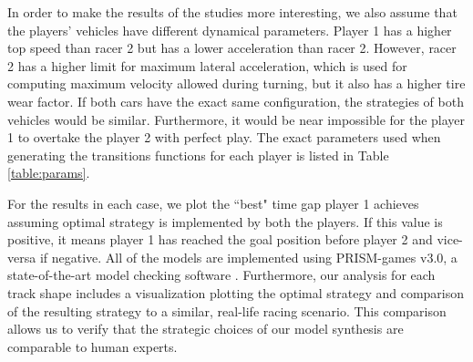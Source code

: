In order to make the results of the studies more interesting, we also assume that the players' vehicles have different dynamical parameters. Player 1 has a higher top speed than racer 2 but has a lower acceleration than racer 2. However, racer 2 has a higher limit for maximum lateral acceleration, which is used for computing maximum velocity allowed during turning, but it also has a higher tire wear factor. If both cars have the exact same configuration, the strategies of both vehicles would be similar. Furthermore, it would be near impossible for the player 1 to overtake the player 2 with perfect play. The exact parameters used when generating the transitions functions for each player is listed in Table \ref{table:params}.

\begin{table}
\caption{Parameters used to generate transitions for the model tested in the case study scenarios.}
\label{table:params}
\end{table}

For the results in each case, we plot the ``best" time gap player 1 achieves assuming optimal strategy is implemented by both the players. If this value is positive, it means player 1 has reached the goal position before player 2 and vice-versa if negative. All of the models are implemented using PRISM-games v3.0, a state-of-the-art model checking software \cite{prismgames}. Furthermore, our analysis for each track shape includes a visualization plotting the optimal strategy and comparison of the resulting strategy to a similar, real-life racing scenario. This comparison allows us to verify that the strategic choices of our model synthesis are comparable to human experts. 

